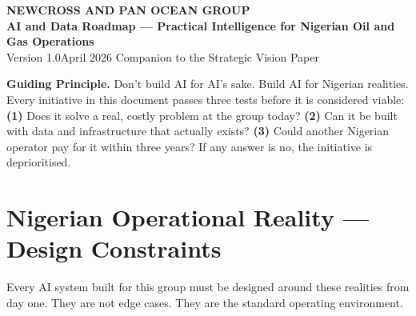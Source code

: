 \documentclass[10pt]{article}
\begin{document}
\begin{center}
  \vspace*{0.15cm}
  {\color{primary}\LARGE\bfseries NEWCROSS AND PAN OCEAN GROUP}\\[5pt]
  {\color{primary}\large\bfseries AI and Data Roadmap --- Practical Intelligence
   for Nigerian Oil and Gas Operations}\\[10pt]
  {\color{darkgrey}\normalsize Version 1.0\quad\textbar\quad April 2026\quad\textbar\quad
   Companion to the Strategic Vision Paper}
\end{center}

\noindent\colorbox{primary!8}{%
\begin{minipage}{\dimexpr\textwidth-2\fboxsep}
  \vspace{5pt}
  \textbf{\color{primary}Guiding Principle.}\quad
  Don't build AI for AI's sake. Build AI for Nigerian realities. Every initiative
  in this document passes three tests before it is considered viable:
  \textbf{(1)} Does it solve a real, costly problem at the group today?
  \textbf{(2)} Can it be built with data and infrastructure that actually exists?
  \textbf{(3)} Could another Nigerian operator pay for it within three years?
  If any answer is no, the initiative is deprioritised.
  \vspace{5pt}
\end{minipage}}

\vspace{10pt}

\section{Nigerian Operational Reality --- Design Constraints}

{\small
Every AI system built for this group must be designed around these realities from
day one. They are not edge cases. They are the standard operating environment.
}
\end{document}
